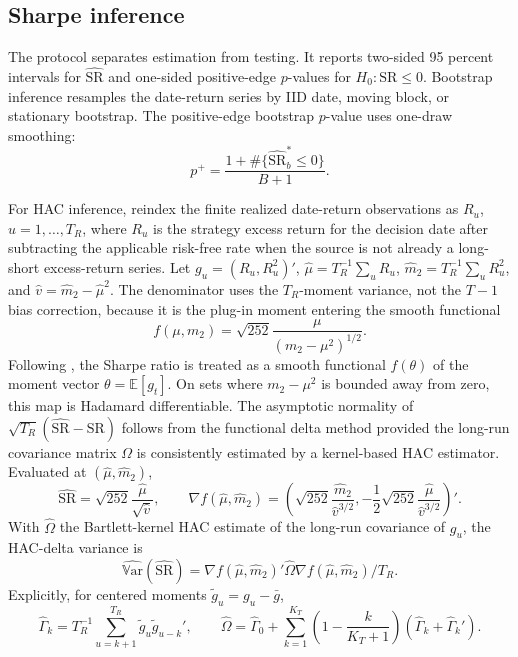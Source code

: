 \documentclass[12pt,a4paper]{article}
\newcommand{\E}{\mathbb{E}}
\newcommand{\Var}{\mathbb{V}\mathrm{ar}}
\newcommand{\SR}{\mathrm{SR}}
\begin{document}
\subsection{Sharpe inference}

The protocol separates estimation from testing.  It reports two-sided
95 percent intervals for \(\widehat{\SR}\) and one-sided positive-edge
\(p\)-values for \(H_0:\SR\le0\).  Bootstrap inference resamples the
date-return series by IID date, moving block, or stationary bootstrap.
The positive-edge bootstrap \(p\)-value uses one-draw smoothing:
\begin{equation}
  p^+ = \frac{1+\#\{\widehat{\SR}_b^*\le 0\}}{B+1}.
\end{equation}

For HAC inference, reindex the finite realized date-return observations
as \(R_u\), \(u=1,\ldots,T_R\), where \(R_u\) is the strategy excess
return for the decision date after subtracting the applicable risk-free
rate when the source is not already a long-short excess-return series.
Let \(g_u=(R_u,R_u^2)'\),
\(\hat\mu=T_R^{-1}\sum_u R_u\),
\(\hat m_2=T_R^{-1}\sum_u R_u^2\), and
\(\hat v=\hat m_2-\hat\mu^2\).  The denominator uses the \(T_R\)-moment
variance, not the \(T-1\) bias correction, because it is the plug-in
moment entering the smooth functional
\[
  f(\mu,m_2)=\sqrt{252}\frac{\mu}{(m_2-\mu^2)^{1/2}}.
\]
Following \citet{ledoit2008robust}, the Sharpe ratio is treated as a
smooth functional \(f(\theta)\) of the moment vector
\(\theta=\E[g_t]\).  On sets where \(m_2-\mu^2\) is bounded away from
zero, this map is Hadamard differentiable.  The asymptotic normality of
\(\sqrt{T_R}(\widehat{\SR}-\SR)\) follows from the functional delta method
provided the long-run covariance matrix \(\Omega\) is consistently
estimated by a kernel-based HAC estimator.
Evaluated at \((\hat\mu,\hat m_2)\),
\[
  \widehat{\SR}=\sqrt{252}\frac{\hat\mu}{\sqrt{\hat v}},
  \qquad
  \nabla f(\hat\mu,\hat m_2) =
  \left(
  \sqrt{252}\frac{\hat m_2}{\hat v^{3/2}},
  -\frac{1}{2}\sqrt{252}\frac{\hat\mu}{\hat v^{3/2}}
  \right)' .
\]
With \(\widehat{\Omega}\) the Bartlett-kernel HAC estimate of the
long-run covariance of \(g_u\), the HAC-delta variance is
\begin{equation}
  \widehat{\Var}(\widehat{\SR})
  =\nabla f(\hat\mu,\hat m_2)'\widehat{\Omega}
   \nabla f(\hat\mu,\hat m_2)/T_R .
  \label{eq:hac-delta}
\end{equation}
Explicitly, for centered moments \(\tilde g_u=g_u-\bar g\),
\[
  \widehat{\Gamma}_k
  = T_R^{-1}\sum_{u=k+1}^{T_R}\tilde g_u\tilde g_{u-k}',
  \qquad
  \widehat{\Omega}
  = \widehat{\Gamma}_0
    +\sum_{k=1}^{K_T} \left(1-\frac{k}{K_T+1}\right)
      \left(\widehat{\Gamma}_k+\widehat{\Gamma}_k'\right).
\]
\end{document}
